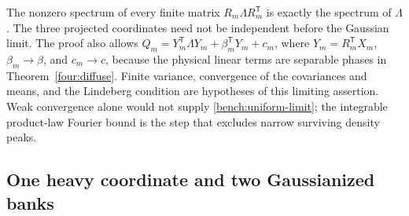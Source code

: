 \begin{remark}
The nonzero spectrum of every finite matrix
\(R_m\Lambda R_m^{\mathsf T}\) is exactly the spectrum of \(\Lambda\).
The three projected coordinates need not be independent before the
Gaussian limit.  The proof also allows
\(Q_m=Y_m^{\mathsf T}\Lambda Y_m+\beta_m^{\mathsf T}Y_m+c_m\),
where \(Y_m=R_m^{\mathsf T}X_m\), \(\beta_m\to\beta\), and
\(c_m\to c\), because the physical linear terms are separable phases
in Theorem~\ref{four:diffuse}.  Finite variance, convergence of the
covariances and means, and the Lindeberg condition are hypotheses of
this limiting assertion.
Weak convergence alone would not supply
\eqref{bench:uniform-limit}; the integrable product-law Fourier bound
is the step that excludes narrow surviving density peaks.
\end{remark}

\subsection{One heavy coordinate and two Gaussianized banks}

